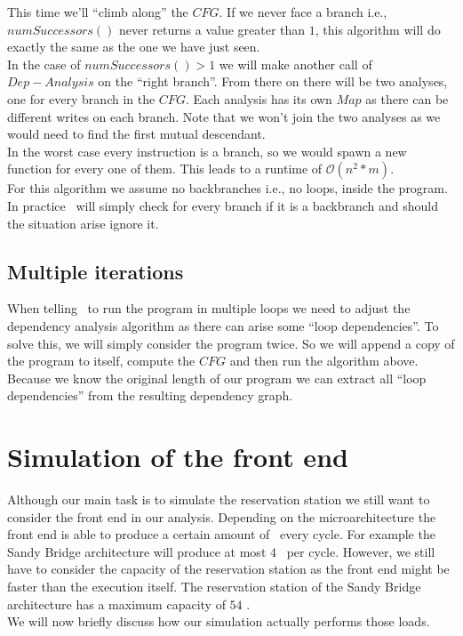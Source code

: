 This time we'll ``climb along'' the $CFG$. If we never face a branch i.e., $numSuccessors()$ never returns a value greater than $1$, this algorithm will do exactly the same as the one we have just seen.\\
In the case of $numSuccessors() > 1$ we will make another call of $Dep-Analysis$ on the ``right branch''. From there on there will be two analyses, one for every branch in the $CFG$. Each analysis has its own $Map$ as there can be different writes on each branch. Note that we won't join the two analyses as we would need to find the first mutual descendant.\\
In the worst case every instruction is a branch, so we would spawn a new function for every one of them. This leads to a runtime of $\mathcal{O}(n^2*m)$.\\
For this algorithm we assume no backbranches i.e., no loops, inside the program. In practice \suaca\ will simply check for every branch if it is a backbranch and should the situation arise ignore it.


\subsection{Multiple iterations}

When telling \suaca\ to run the program in multiple loops we need to adjust the dependency analysis algorithm as there can arise some ``loop dependencies''. To solve this, we will simply consider the program twice. So we will append a copy of the program to itself, compute the $CFG$ and then run the algorithm above. Because we know the original length of our program we can extract all ``loop dependencies'' from the resulting dependency graph.


\section{Simulation of the front end}
\label{sec:simfrontend}

Although our main task is to simulate the reservation station we still want to consider the front end in our analysis. Depending on the microarchitecture the front end is able to produce a certain amount of \microops\ every cycle. For example the Sandy Bridge architecture will produce at most $4$ \microops\ per cycle. However, we still have to consider the capacity of the reservation station as the front end might be faster than the execution itself. The reservation station of the Sandy Bridge architecture has a maximum capacity of $54$ \microops.\\
We will now briefly discuss how our simulation actually performs those loads.

